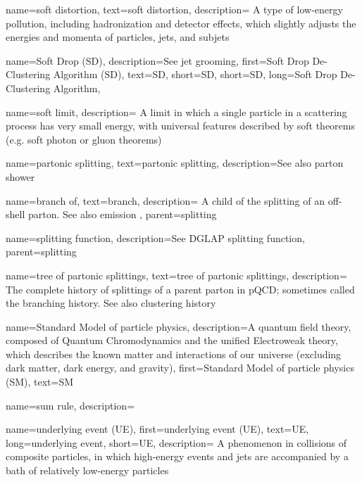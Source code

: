 {
  name=soft distortion,
  text=soft distortion,
  description={
        A type of low-energy pollution, including hadronization and detector effects, which slightly adjusts the energies and momenta of particles, jets, and subjets
  }
}

{
    name=Soft Drop (SD),
    description={See jet grooming},
    first={Soft Drop De-Clustering Algorithm (SD)},
    text={SD},
    short={SD},
    short={SD},
    long={Soft Drop De-Clustering Algorithm},
}


{
    name=soft limit,
    description={
        A limit in which a single particle in a scattering process has very small energy, with universal features described by soft theorems (e.g. soft photon or gluon theorems)
    }
}

{
  name=partonic splitting,
  text=partonic splitting,
  description={See also parton shower}
}

    {
      name=branch of,
      text=branch,
      description={
          A child of the splitting of an off-shell parton.
          See also emission
      },
      parent=splitting
    }


    {
      name=splitting function,
      description={See DGLAP splitting function},
      parent=splitting
    }

    {
      name=tree of partonic splittings,
      text=tree of partonic splittings,
      description={
          The complete history of splittings of a parent parton in pQCD;
          sometimes called the branching history.
          See also clustering history
      }
    }





{
  name=Standard Model of particle physics,
  description={A quantum field theory, composed of Quantum Chromodynamics and the unified Electroweak theory, which describes the known matter and interactions of our universe (excluding dark matter, dark energy, and gravity)},
  first=Standard Model of particle physics (SM),
  text=SM
}

{
  name=sum rule,
  description={}
}


{
  name=underlying event (UE),
  first=underlying event (UE),
  text=UE,
  long=underlying event,
  short=UE,
  description={
      A phenomenon in collisions of composite particles, in which high-energy events and jets are accompanied by a bath of relatively low-energy particles
  }
}

